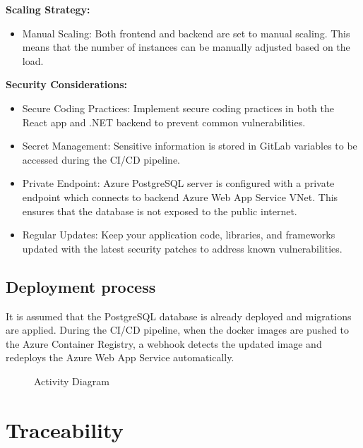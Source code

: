 \documentclass[
    english, %
]{VUMIFPSkursinis}
\begin{document}
\textbf{Scaling Strategy:}
\begin{itemize}
    \item Manual Scaling: Both frontend and backend are set to manual scaling. This means that the number of instances can be manually adjusted based on the load.
\end{itemize}

\textbf{Security Considerations:}
\begin{itemize}
    \item Secure Coding Practices: Implement secure coding practices in both the React app and .NET backend to prevent common vulnerabilities.
    \item Secret Management: Sensitive information is stored in GitLab variables to be accessed during the CI/CD pipeline.
    \item Private Endpoint: Azure PostgreSQL server is configured with a private endpoint which connects to backend Azure Web App Service VNet. This ensures that the database is not exposed to the public internet.
    \item Regular Updates: Keep your application code, libraries, and frameworks updated with the latest security patches to address known vulnerabilities.
\end{itemize}

\subsection{Deployment process}

It is assumed that the PostgreSQL database is already deployed and migrations are applied. During the CI/CD pipeline, when the docker images are pushed to the Azure Container Registry, a webhook detects the updated image and redeploys the Azure Web App Service automatically.

\begin{figure}[ht]
    \centering
    
    \label{activity-diagram}
    \caption{Activity Diagram}
\end{figure}

\section{Traceability}

\listoffigures
\printbibliography[heading=bibintoc]
\end{document}
